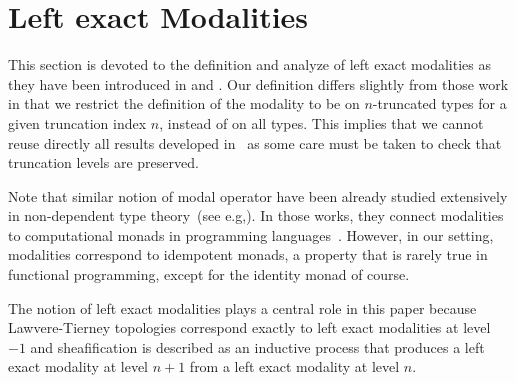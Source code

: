 \documentclass[preprint,9pt,numbers]{sigplanconf}
\newtheorem{thm}{Theorem}
\newcommand{\eg}{e.g,\xspace}
\begin{document}




\section{Left exact Modalities}
\label{sec:lexmod}

This section is devoted to the definition and analyze of left exact
modalities as they have been introduced in \cite{hottbook} and
\cite{shulman-higher-modalities}. Our definition differs slightly from
those work in that we restrict the definition of the modality to be on
$n$-truncated types for a given truncation index $n$, instead of on
all types.
%
This implies that we cannot reuse directly all results developed
in~\cite{hottbook} as some care must be taken to check that truncation
levels are preserved.

Note that similar notion of modal operator have been already studied
extensively in non-dependent type
theory~(see \eg \cite{benton1998computational}). In those works, they connect
modalities to computational monads in programming
languages~\cite{moggi-monad}. However, in our setting, modalities
correspond to idempotent monads, a property that is rarely true 
in functional programming, except for the identity monad of course.

The notion of left exact modalities plays a central role in this paper
because Lawvere-Tierney topologies correspond exactly to left exact
modalities at level $-1$ and sheafification is described as an inductive
process that produces a left exact modality at level $n+1$ from a
left exact modality at level $n$. 

\end{document}
